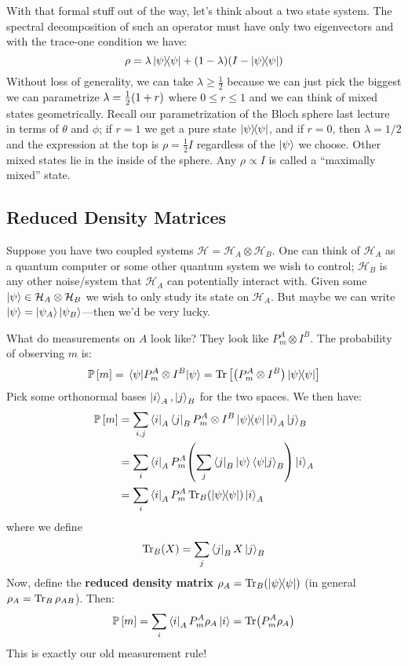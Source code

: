 With that formal stuff out of the way, let's think about a two state system. The spectral decomposition
of such an operator must have only two eigenvectors and with the trace-one condition we have:
\[ \rho = \lambda \ketbra{\psi}{\psi} + (1 - \lambda)(I - \ketbra{\psi}{\psi}) \]
Without loss of generality, we can take $\lambda \geq \frac{1}{2}$ because we can just pick the biggest
we can parametrize $\lambda = \frac{1}{2} \qty(1 + r)$ where $0 \leq r \leq 1$ and we can think of
mixed states geometrically. Recall our parametrization of the Bloch sphere last lecture in terms of $\theta$ and $\phi$;
if $r = 1$ we get a pure state $\ketbra{\psi}{\psi}$, and if $r = 0$, then $\lambda = 1/2$ and the expression at the top is $\rho = \frac{1}{2} I$
regardless of the $\ket{\psi}$ we choose. Other mixed states lie in the inside of the sphere. Any $\rho \propto I$ is called a
``maximally mixed'' state.

\subsection{Reduced Density Matrices}
Suppose you have two coupled systems $\mathcal{H} = \mathcal{H}_A \otimes \mathcal{H}_B$. One can think
of $\mathcal{H}_A$ as a quantum computer or some other quantum system we wish to control; $\mathcal{H}_B$ is any other
noise/system that $\mathcal{H}_A$ can potentially interact with. Given some $\ket{\psi} \in \mathcal{H}_A \otimes \mathcal{H}_B$
we wish to only study its state on $\mathcal{H}_A$. But maybe we can write $\ket{\psi} = \ket{\psi_A} \ket{\psi_B}$—then we'd be very lucky.

What do measurements on $A$ look like? They look like $P_m^{A} \otimes I^B$. The probability of observing $m$ is:
\[ \mathbb{P}\left[ m \right] = \mel{\psi}{P_m^A \otimes I^B}{\psi} = \Tr\qty[\qty(P_m^A \otimes I^B) \ketbra{\psi}{\psi}] \]
Pick some orthonormal bases $\ket{i}_A, \ket{j}_B$ for the two spaces. We then have:
\begin{align*}
    \mathbb{P}\left[ m \right] &= \sum_{i, j} \bra{i}_A \bra{j}_B P_m^A \otimes I^B \ketbra{\psi}{\psi} \ket{i}_A \ket{j}_B \\
    &= \sum_{i} \bra{i}_A P_m^A \qty(\sum_j \bra{j}_B\ket{\psi} \bra{\psi} \ket{j}_B) \ket{i}_A \\
    &= \sum_{i} \bra{i}_A P_m^A \Tr_B(\ketbra{\psi}{\psi}) \ket{i}_A
\end{align*}
where we define 
\[ \Tr_B(X) = \sum_j \bra{j}_B X \ket{j}_B \]
Now, define the \textbf{reduced density matrix} $\rho_A = \Tr_B(\ketbra{\psi}{\psi})$ (in general $\rho_A = \Tr_B \rho_{AB}$). Then:
\[ \mathbb{P}\left[ m \right] = \sum_i \bra{i}_A P_m^A \rho_A \ket{i} = \Tr(P_m^A \rho_A) \]
This is exactly our old measurement rule!


